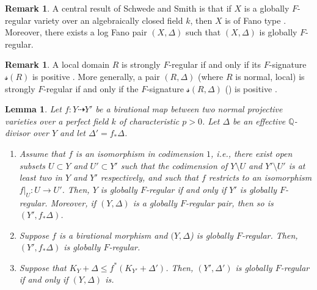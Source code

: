 \documentclass[11pt,reqno]{amsart}
\newcommand{\Q}{\mathbb{Q}}
\numberwithin{equation}{section}
\newtheorem{lem}[prop] {Lemma}
\theoremstyle{definition}
\newtheorem{rem}[prop] {Remark}
\newcommand{\s}{\mathscr{s}}
\begin{document}
\begin{rem}
    A central result of Schwede and Smith is that if $X$ is a globally $F$-regular variety over an algebraically closed field $k$, then $X$ is of Fano type \cite{SchwedeSmithLogFanoVsGloballyFRegular}. Moreover, there exists a log Fano pair $(X,\Delta)$ such that $(X, \Delta)$ is globally $F$-regular.
\end{rem}

\begin{rem}\label{FregularityremarK}
A local domain $R$ is strongly $F$-regular if and only if its $F$-signature $\s(R)$ is positive \cite{AberbachLeuschke}. More generally, a pair $(R, \Delta)$ (where $R$ is normal, local) is strongly $F$-regular if and only if the $F$-signature $\s(R, \Delta)$ () is positive \cite[Theorem 3.18]{BlickleSchwedeTuckerFSigPairs1}.
\end{rem}



\begin{lem} \label{lem:GFRunderbirationalmap} 
 Let $f: Y \dashrightarrow Y'$ be a birational map between two normal projective varieties over a perfect field $k$ of characteristic $p>0$. Let $\Delta$ be an effective $\Q$-divisor over $Y$ and let $\Delta' = f_* \Delta$.
\begin{enumerate}
\item Assume that $f$ is an isomorphism in codimension $1$, i.e., there exist open subsets $U \subset Y$ and $U' \subset Y'$ such that the codimension of $Y \setminus U$ and $Y' \setminus U'$ is at least two in $Y$ and $Y'$ respectively, and such that $f$ restricts to an isomorphism $f|_U : U \to U'$. Then, $Y$ is globally $F$-regular if and only if $Y'$ is globally $F$-regular. Moreover, if $(Y, \Delta)$ is a globally $F$-regular pair, then so is $(Y', f_* \Delta)$.

\item Suppose $f$ is a birational morphism and $(Y, \Delta$) is globally $F$-regular. Then, $(Y', f_* \Delta) $ is globally $F$-regular.

\item Suppose that $K_Y+\Delta \leq f^*(K_{Y'}+\Delta')$. Then, $(Y',\Delta')$ is globally $F$-regular  if and only if $(Y,\Delta)$ is.
\end{enumerate}
\end{lem}
\end{document}
